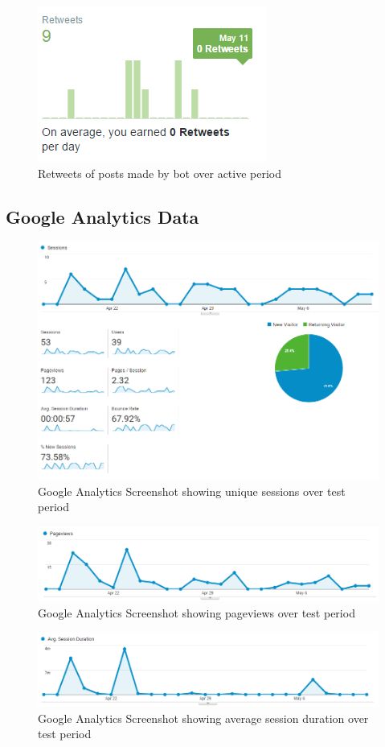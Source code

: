 \begin{figure}
\centering
\includegraphics[width=0.7\linewidth]{figures/twitter_analytics/retweets}
\caption{Retweets of posts made by bot over active period}
\label{fig:retweets}
\end{figure}



\subsection{Google Analytics Data}
\begin{figure}
\centering
\includegraphics[width=0.7\linewidth]{figures/google_analytics/uniqueSessions}
\caption{Google Analytics Screenshot showing unique sessions over test period}
\label{fig:uniquesessions}
\end{figure}
\begin{figure}
\centering
\includegraphics[width=0.7\linewidth]{figures/google_analytics/pageviews}
\caption{Google Analytics Screenshot showing pageviews over test period}
\label{fig:pageviews}
\end{figure}
\begin{figure}
\centering
\includegraphics[width=0.7\linewidth]{figures/google_analytics/sessionDuration}
\caption{Google Analytics Screenshot showing average session duration over test period}
\label{fig:sessionduration}
\end{figure}

